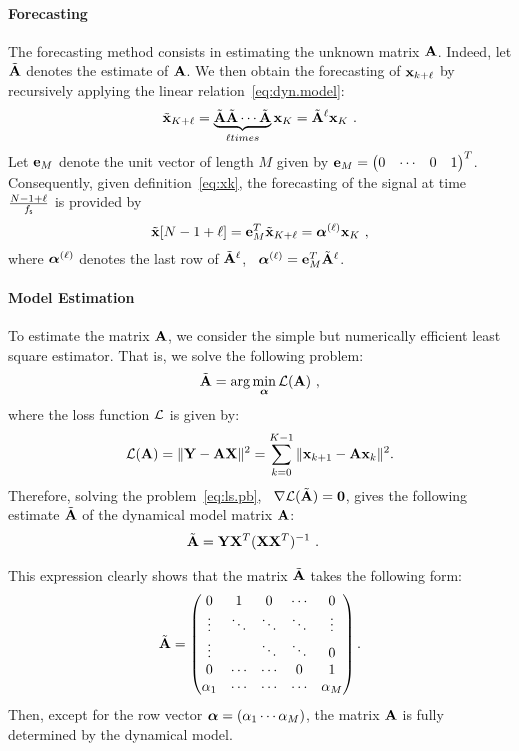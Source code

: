 \paragraph{Forecasting}
The forecasting method consists in estimating the unknown matrix ${\mathbf A}$. Indeed, let $\tilde{{\mathbf A}}$ denotes the estimate of ${\mathbf A}$. 
%
We then obtain the forecasting of ${\mathbf x}_{k+\ell}$ by recursively applying the linear relation~\eqref{eq:dyn.model}:
\begin{equation*}
\tilde\bx_{K+\ell} = \underbrace{\tilde\bA\tilde\bA\cdots\tilde\bA}_{\scriptstyle\ell\mbox{ \footnotesize {times}}}\bx_{K} = \tilde\bA^\ell\bx_{K}\ .
\end{equation*}  
Let ${\mathbf e}_M$ denote the unit vector of length $M$ given by ${\mathbf e}_M = \begin{pmatrix} 0 & \cdots & 0 & 1\end{pmatrix}^T$. Consequently, given definition~\eqref{eq:xk}, the forecasting of the signal at time $\frac{N-1+\ell}{f_{\mathsf s}}$ is provided by
\begin{equation}
\label{eq:prediction}
\tilde \bx [N-1+\ell] = \be_M^T\tilde\bx_{K+\ell} = \balpha^{(\ell)}\bx_{K}\ ,
\end{equation}  
where $\boldsymbol{\alpha}^{(\ell)}$ denotes the last row of $\tilde{{\mathbf A}}^\ell$, \ie~$\boldsymbol{\alpha}^{(\ell)}={\mathbf e}_M^T\tilde{{\mathbf A}}^\ell$.

\paragraph{Model Estimation} To estimate the matrix ${\mathbf A}$, we consider the simple but numerically efficient least square estimator. That is, we solve the following problem:
\begin{equation}
\label{eq:ls.pb}
\tilde\bA = \arg\min_{\balpha} \cL(\bA)\ ,
\end{equation}
where the loss function ${\mathcal L}$ is given by:
\[
{\mathcal L}({\mathbf A}) = \|{\mathbf Y}-{\mathbf A}{\mathbf X}\|^2 = \sum_{k=0}^{K-1} \|{\mathbf x}_{k+1}-{\mathbf A}{\mathbf x}_k\|^2.
\]
Therefore, solving the problem~\eqref{eq:ls.pb}, \ie~$\nabla {\mathcal L}(\tilde{{\mathbf A}})=\boldsymbol{0}$, gives the following estimate $\tilde{{\mathbf A}}$ of the dynamical model matrix ${\mathbf A}$:
\begin{align}
\tilde\bA &= \bY\bX^T(\bX\bX^T)^{-1}\ .
\label{eq:lse}
\end{align}

\begin{remark}
This expression clearly shows that the matrix $\tilde{{\mathbf A}}$ takes the following form:
\[
\tilde{{\mathbf A}} =
\begin{pmatrix}
0       & 1       & 0      & \cdots & 0      \\
\vdots  & \ddots  & \ddots & \ddots & \vdots  \\
\vdots  &         & \ddots & \ddots & 0  \\
0       & \cdots  & \cdots & 0      & 1  \\
\alpha_1& \cdots  & \cdots & \cdots & \alpha_M  \\
\end{pmatrix}.
\]
Then, except for the row vector $\boldsymbol{\alpha} = \left(\alpha_1 \cdots\alpha_M\right)$, the matrix ${\mathbf A}$ is fully determined by the dynamical model.
\end{remark}

